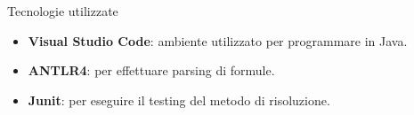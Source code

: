 \documentclass{beamer}
\begin{document}
\begin{frame}{Tecnologie utilizzate}
    \begin{itemize}
        \item \textbf{Visual Studio Code}: ambiente utilizzato per programmare in Java.
        \vspace{10px}
        \item \textbf{ANTLR4}: per effettuare parsing di formule.
        \vspace{10px}
        \item \textbf{Junit}: per eseguire il testing del metodo di risoluzione.
    \end{itemize}
\end{frame}


\backmatter
\end{document}
